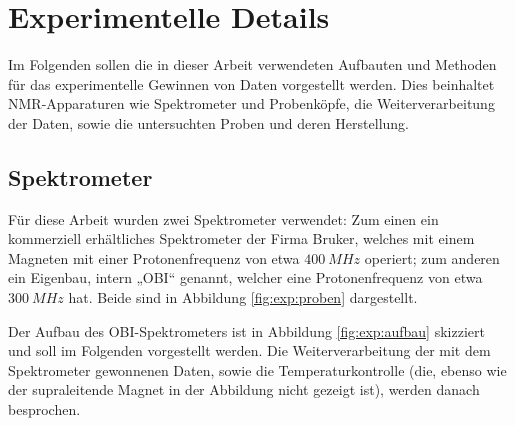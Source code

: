 \chapter{Experimentelle Details} \label{chapter:exp_details}

Im Folgenden sollen die in dieser Arbeit verwendeten Aufbauten und Methoden für das experimentelle Gewinnen von Daten vorgestellt werden. Dies beinhaltet NMR-Apparaturen wie Spektrometer und Probenköpfe, die Weiterverarbeitung der Daten, sowie die untersuchten Proben und deren Herstellung.

\section{Spektrometer} \label{section:exp:spektrometer}

Für diese Arbeit wurden zwei Spektrometer verwendet: Zum einen ein kommerziell erhältliches Spektrometer der Firma Bruker, welches mit einem Magneten mit einer Protonenfrequenz von etwa $\SI{400}{MHz}$ operiert; zum anderen ein Eigenbau, intern „OBI“ genannt, welcher eine Protonenfrequenz von etwa $\SI{300}{MHz}$ hat. Beide sind in Abbildung \ref{fig:exp:proben} dargestellt.

Der Aufbau des OBI-Spektrometers ist in Abbildung \ref{fig:exp:aufbau} skizziert und soll im Folgenden vorgestellt werden. Die Weiterverarbeitung der mit dem Spektrometer gewonnenen Daten, sowie die Temperaturkontrolle (die, ebenso wie der supraleitende Magnet in der Abbildung nicht gezeigt ist), werden danach besprochen.

